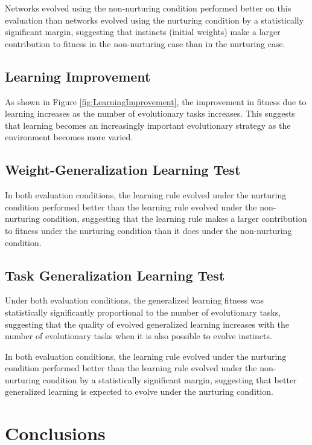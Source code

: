 \documentclass[master]{outhesis}
\begin{document}
Networks evolved using the non-nurturing condition performed better on this evaluation than networks evolved using the nurturing condition by a statistically significant margin,
suggesting that instincts (initial weights) make a larger contribution to fitness in the non-nurturing case than in the nurturing case.

\section{Learning Improvement}

As shown in Figure \ref{fig:LearningImprovement},
the improvement in fitness due to learning increases as the number of evolutionary tasks increases.
This suggests that learning becomes an increasingly important evolutionary strategy as the environment becomes more varied.

\section{Weight-Generalization Learning Test}

In both evaluation conditions,
the learning rule evolved under the nurturing condition performed better than the learning rule evolved under the non-nurturing condition,
suggesting that the learning rule makes a larger contribution to fitness under the nurturing condition than it does under the non-nurturing condition.

\section{Task Generalization Learning Test}

Under both evaluation conditions, 
the generalized learning fitness was statistically significantly proportional to the number of evolutionary tasks,
suggesting that the quality of evolved generalized learning increases with the number of evolutionary tasks when it is also possible to evolve instincts.

In both evaluation conditions,
the learning rule evolved under the nurturing condition performed better than the learning rule evolved under the non-nurturing condition by a statistically significant margin,
suggesting that better generalized learning is expected to evolve under the nurturing condition.

\chapter{Conclusions}
\end{document}
